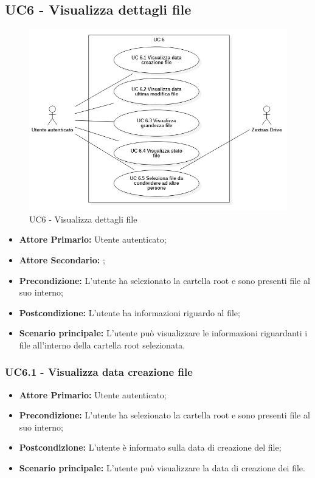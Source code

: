 \subsection{UC6 - Visualizza dettagli file}
\label{UC6}
\begin{figure}[H]
    \centering
    \includegraphics[scale = 0.7]{components/img/UC6.png}
    \caption{UC6 - Visualizza dettagli file}
\end{figure}
\begin{itemize}
\item \textbf{Attore Primario:} Utente autenticato;
\item \textbf{Attore Secondario:} ;
\item \textbf{Precondizione:} L'utente ha selezionato la cartella root e sono presenti file al suo interno;
\item \textbf{Postcondizione:} L'utente ha informazioni riguardo al file;
\item \textbf{Scenario principale:} L'utente può visualizzare le informazioni riguardanti i file all'interno della cartella root selezionata.
\end{itemize}

\subsubsection{UC6.1 - Visualizza data creazione file}
\label{UC6.1}
\begin{itemize}
\item \textbf{Attore Primario:} Utente autenticato;
\item \textbf{Precondizione:} L'utente ha selezionato la cartella root e sono presenti file al suo interno;
\item \textbf{Postcondizione:} L'utente è informato sulla data di creazione del file;
\item \textbf{Scenario principale:} L'utente può visualizzare la data di creazione dei file.
\end{itemize}

